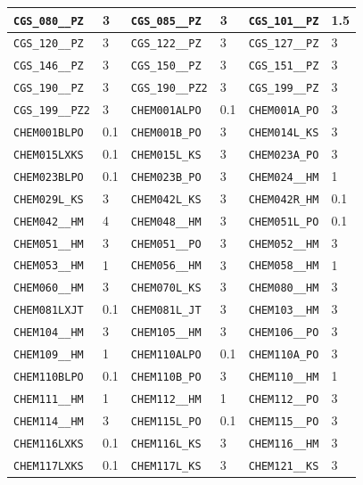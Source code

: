\begin{longtable}{|l|l||l|l||l|l|}
    \verb|CGS_080__PZ| & 3 & \verb|CGS_085__PZ| & 3 & \verb|CGS_101__PZ| & 1.5\\\hline
    \verb|CGS_120__PZ| & 3 & \verb|CGS_122__PZ| & 3 & \verb|CGS_127__PZ| & 3\\\hline
    \verb|CGS_146__PZ| & 3 & \verb|CGS_150__PZ| & 3 & \verb|CGS_151__PZ| & 3\\\hline
    \verb|CGS_190__PZ| & 3 & \verb|CGS_190__PZ2| & 3 & \verb|CGS_199__PZ| & 3\\\hline
    \verb|CGS_199__PZ2| & 3 & \verb|CHEM001ALPO| & 0.1 & \verb|CHEM001A_PO| & 3\\\hline
    \verb|CHEM001BLPO| & 0.1 & \verb|CHEM001B_PO| & 3 & \verb|CHEM014L_KS| & 3\\\hline
    \verb|CHEM015LXKS| & 0.1 & \verb|CHEM015L_KS| & 3 & \verb|CHEM023A_PO| & 3\\\hline
    \verb|CHEM023BLPO| & 0.1 & \verb|CHEM023B_PO| & 3 & \verb|CHEM024__HM| & 1\\\hline
    \verb|CHEM029L_KS| & 3 & \verb|CHEM042L_KS| & 3 & \verb|CHEM042R_HM| & 0.1\\\hline
    \verb|CHEM042__HM| & 4 & \verb|CHEM048__HM| & 3 & \verb|CHEM051L_PO| & 0.1\\\hline
    \verb|CHEM051__HM| & 3 & \verb|CHEM051__PO| & 3 & \verb|CHEM052__HM| & 3\\\hline
    \verb|CHEM053__HM| & 1 & \verb|CHEM056__HM| & 3 & \verb|CHEM058__HM| & 1\\\hline
    \verb|CHEM060__HM| & 3 & \verb|CHEM070L_KS| & 3 & \verb|CHEM080__HM| & 3\\\hline
    \verb|CHEM081LXJT| & 0.1 & \verb|CHEM081L_JT| & 3 & \verb|CHEM103__HM| & 3\\\hline
    \verb|CHEM104__HM| & 3 & \verb|CHEM105__HM| & 3 & \verb|CHEM106__PO| & 3\\\hline
    \verb|CHEM109__HM| & 1 & \verb|CHEM110ALPO| & 0.1 & \verb|CHEM110A_PO| & 3\\\hline
    \verb|CHEM110BLPO| & 0.1 & \verb|CHEM110B_PO| & 3 & \verb|CHEM110__HM| & 1\\\hline
    \verb|CHEM111__HM| & 1 & \verb|CHEM112__HM| & 1 & \verb|CHEM112__PO| & 3\\\hline
    \verb|CHEM114__HM| & 3 & \verb|CHEM115L_PO| & 0.1 & \verb|CHEM115__PO| & 3\\\hline
    \verb|CHEM116LXKS| & 0.1 & \verb|CHEM116L_KS| & 3 & \verb|CHEM116__HM| & 3\\\hline
    \verb|CHEM117LXKS| & 0.1 & \verb|CHEM117L_KS| & 3 & \verb|CHEM121__KS| & 3\\\hline

\end{longtable}
